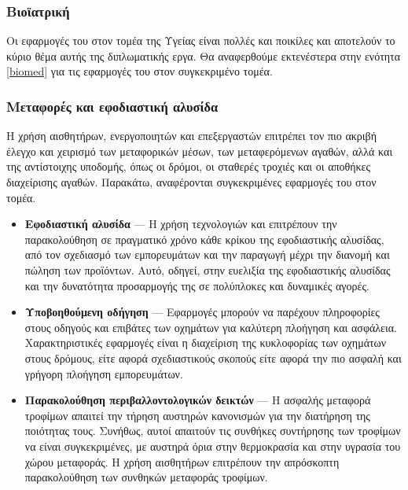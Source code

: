 \subsubsection{Βιοϊατρική}
Οι εφαρμογές του  στον τομέα της Υγείας είναι πολλές και ποικίλες και αποτελούν το κύριο θέμα αυτής της διπλωματικής εργα. Θα αναφερθούμε εκτενέστερα στην ενότητα \ref{biomed} για τις εφαρμογές του  στον συγκεκριμένο τομέα.
\subsubsection{Μεταφορές και εφοδιαστική αλυσίδα}
Η χρήση αισθητήρων, ενεργοποιητών και επεξεργαστών επιτρέπει τον πιο ακριβή έλεγχο και χειρισμό των μεταφορικών μέσων, των μεταφερόμενων αγαθών, αλλά και της αντίστοιχης υποδομής, όπως οι δρόμοι, οι σταθερές τροχιές και οι αποθήκες διαχείρισης αγαθών.
Παρακάτω, αναφέρονται συγκεκριμένες εφαρμογές του  στον τομέα.
\begin{itemize}
    \item \textbf{Εφοδιαστική αλυσίδα} --- Η χρήση τεχνολογιών  και  επιτρέπουν την παρακολούθηση σε πραγματικό χρόνο κάθε κρίκου της εφοδιαστικής αλυσίδας, από τον σχεδιασμό των εμπορευμάτων και την παραγωγή μέχρι την διανομή και πώληση των προϊόντων.
    Αυτό, οδηγεί, στην ευελιξία της εφοδιαστικής αλυσίδας και την δυνατότητα προσαρμογής της σε πολύπλοκες και δυναμικές αγορές.
    \item \textbf{Υποβοηθούμενη οδήγηση} --- Εφαρμογές  μπορούν να παρέχουν πληροφορίες στους οδηγούς και επιβάτες των οχημάτων για καλύτερη πλοήγηση και ασφάλεια. Χαρακτηριστικές εφαρμογές είναι η διαχείριση της κυκλοφορίας των οχημάτων στους δρόμους, είτε αφορά σχεδιαστικούς σκοπούς είτε αφορά την πιο ασφαλή και γρήγορη πλοήγηση εμπορευμάτων.
    \item \textbf{Παρακολούθηση περιβαλλοντολογικών δεικτών} --- Η ασφαλής μεταφορά τροφίμων απαιτεί την τήρηση αυστηρών κανονισμών για την διατήρηση της ποιότητας τους.
    Συνήθως, αυτοί απαιτούν τις συνθήκες συντήρησης των τροφίμων να είναι συγκεκριμένες, με αυστηρά όρια στην θερμοκρασία και στην υγρασία του χώρου μεταφοράς. Η χρήση αισθητήρων επιτρέπουν την απρόσκοπτη παρακολούθηση των συνθηκών μεταφοράς τροφίμων.
\end{itemize}

